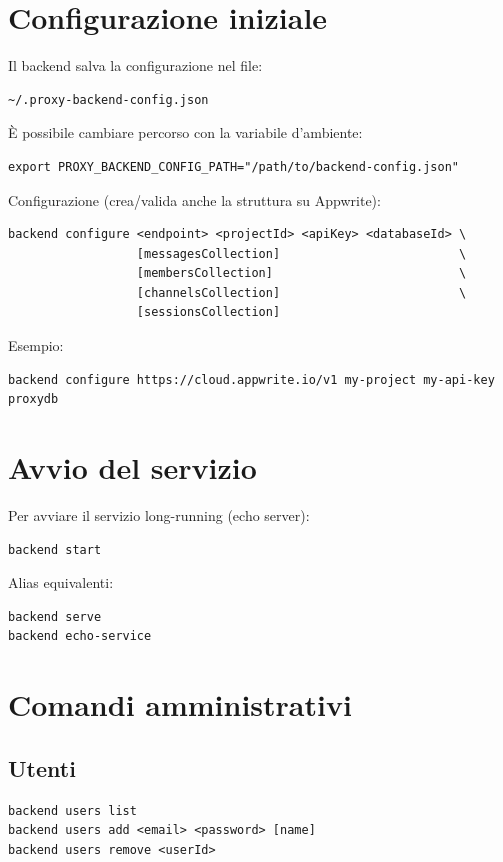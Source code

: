 \documentclass[a4paper, 11pt, twoside]{report}
\begin{document}
\section{Configurazione iniziale}

Il backend salva la configurazione nel file:
\begin{verbatim}
~/.proxy-backend-config.json
\end{verbatim}

\noindent È possibile cambiare percorso con la variabile d'ambiente:
\begin{verbatim}
export PROXY_BACKEND_CONFIG_PATH="/path/to/backend-config.json"
\end{verbatim}

\noindent Configurazione (crea/valida anche la struttura su Appwrite):
\begin{verbatim}
backend configure <endpoint> <projectId> <apiKey> <databaseId> \
                  [messagesCollection]                         \ 
                  [membersCollection]                          \
                  [channelsCollection]                         \
                  [sessionsCollection]
\end{verbatim}

\noindent Esempio:
\noindent \begin{verbatim}
backend configure https://cloud.appwrite.io/v1 my-project my-api-key proxydb
\end{verbatim}

\section{Avvio del servizio}

\noindent Per avviare il servizio long-running (echo server):
\begin{verbatim}
backend start
\end{verbatim}

\noindent Alias equivalenti:
\begin{verbatim}
backend serve
backend echo-service
\end{verbatim}

\section{Comandi amministrativi}

\subsection{Utenti}
\begin{verbatim}
backend users list
backend users add <email> <password> [name]
backend users remove <userId>
\end{verbatim}
\end{document}
